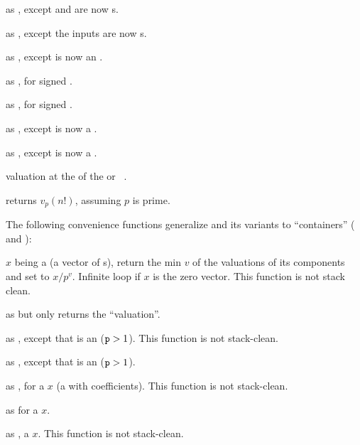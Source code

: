  as ,
except  and  are now s.

 as ,
except the inputs are now s.

 as ,
except  is now an .

 as , for signed .

 as , for signed .

 as ,
except  is now a .

 as ,
except  is now a .

 valuation at the  
of the  or ~.

 returns $v_p(n!)$, assuming
$p$ is prime.


The following convenience functions generalize  and its variants
to ``containers'' ( and ):


 $x$ being a  (a vector
of s), return the min $v$ of the valuations of its components and
set  to $x/p^v$. Infinite loop if $x$ is the zero vector.
This function is not stack clean.

 as  but only returns the
``valuation''.

 as ,
except that  is an  (${\tt p} > 1$).
This function is not stack-clean.

 as ,
except that  is an  (${\tt p} > 1$).


 as , for
a  $x$ (a  with  coefficients).
This function is not stack-clean.

 as  for a  $x$.

 as ,
a  $x$.
This function is not stack-clean.

